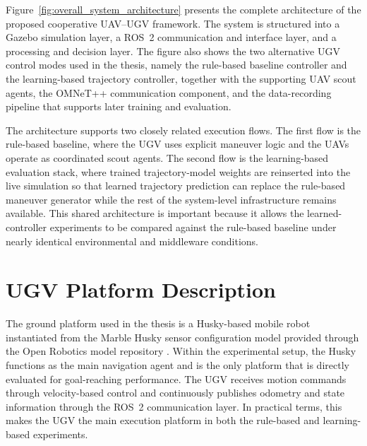 Figure~\ref{fig:overall_system_architecture} presents the complete architecture of the proposed cooperative UAV--UGV framework. The system is structured into a Gazebo simulation layer, a ROS~2 communication and interface layer, and a processing and decision layer. The figure also shows the two alternative UGV control modes used in the thesis, namely the rule-based baseline controller and the learning-based trajectory controller, together with the supporting UAV scout agents, the OMNeT++ communication component, and the data-recording pipeline that supports later training and evaluation.

The architecture supports two closely related execution flows. The first flow is the rule-based baseline, where the UGV uses explicit maneuver logic and the UAVs operate as coordinated scout agents. The second flow is the learning-based evaluation stack, where trained trajectory-model weights are reinserted into the live simulation so that learned trajectory prediction can replace the rule-based maneuver generator while the rest of the system-level infrastructure remains available. This shared architecture is important because it allows the learned-controller experiments to be compared against the rule-based baseline under nearly identical environmental and middleware conditions.

\section{UGV Platform Description}

The ground platform used in the thesis is a Husky-based mobile robot instantiated from the Marble Husky sensor configuration model provided through the Open Robotics model repository \citeauthor{openrobotics2023husky} \citep{openrobotics2023husky}. Within the experimental setup, the Husky functions as the main navigation agent and is the only platform that is directly evaluated for goal-reaching performance. The UGV receives motion commands through velocity-based control and continuously publishes odometry and state information through the ROS~2 communication layer. In practical terms, this makes the UGV the main execution platform in both the rule-based and learning-based experiments.

